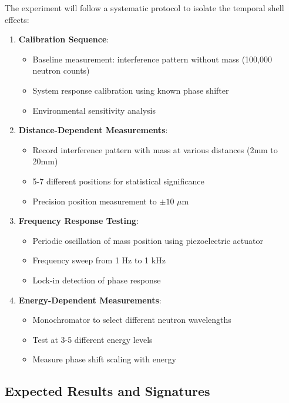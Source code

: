 \documentclass[12pt,a4paper]{article}
\begin{document}
The experiment will follow a systematic protocol to isolate the temporal shell effects:

\begin{enumerate}
    \item \textbf{Calibration Sequence}:
    \begin{itemize}
        \item Baseline measurement: interference pattern without mass (100,000 neutron counts)
        \item System response calibration using known phase shifter
        \item Environmental sensitivity analysis
    \end{itemize}
    
    \item \textbf{Distance-Dependent Measurements}:
    \begin{itemize}
        \item Record interference pattern with mass at various distances (2mm to 20mm)
        \item 5-7 different positions for statistical significance
        \item Precision position measurement to $\pm 10$ $\mu$m
    \end{itemize}
    
    \item \textbf{Frequency Response Testing}:
    \begin{itemize}
        \item Periodic oscillation of mass position using piezoelectric actuator
        \item Frequency sweep from 1 Hz to 1 kHz
        \item Lock-in detection of phase response
    \end{itemize}
    
    \item \textbf{Energy-Dependent Measurements}:
    \begin{itemize}
        \item Monochromator to select different neutron wavelengths
        \item Test at 3-5 different energy levels
        \item Measure phase shift scaling with energy
    \end{itemize}
\end{enumerate}

\subsection{Expected Results and Signatures}
\end{document}
